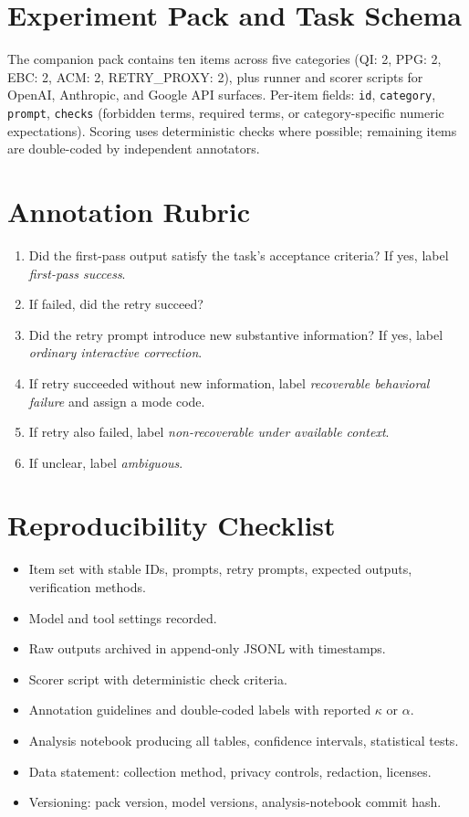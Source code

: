 \documentclass[11pt]{article}
\begin{document}
\section{Experiment Pack and Task Schema}
The companion pack contains ten items across five categories (QI: 2, PPG: 2, EBC: 2, ACM: 2, RETRY\_PROXY: 2), plus runner and scorer scripts for OpenAI, Anthropic, and Google API surfaces. Per-item fields: \texttt{id}, \texttt{category}, \texttt{prompt}, \texttt{checks} (forbidden terms, required terms, or category-specific numeric expectations). Scoring uses deterministic checks where possible; remaining items are double-coded by independent annotators.

\section{Annotation Rubric}
\begin{enumerate}[leftmargin=*, label=\arabic*.]
  \item Did the first-pass output satisfy the task's acceptance criteria? If yes, label \emph{first-pass success}.
  \item If failed, did the retry succeed?
  \item Did the retry prompt introduce new substantive information? If yes, label \emph{ordinary interactive correction}.
  \item If retry succeeded without new information, label \emph{recoverable behavioral failure} and assign a mode code.
  \item If retry also failed, label \emph{non-recoverable under available context}.
  \item If unclear, label \emph{ambiguous}.
\end{enumerate}

\section{Reproducibility Checklist}
\begin{itemize}[leftmargin=*]
  \item Item set with stable IDs, prompts, retry prompts, expected outputs, verification methods.
  \item Model and tool settings recorded.
  \item Raw outputs archived in append-only JSONL with timestamps.
  \item Scorer script with deterministic check criteria.
  \item Annotation guidelines and double-coded labels with reported $\kappa$ or $\alpha$.
  \item Analysis notebook producing all tables, confidence intervals, statistical tests.
  \item Data statement: collection method, privacy controls, redaction, licenses.
  \item Versioning: pack version, model versions, analysis-notebook commit hash.
\end{itemize}
\end{document}
